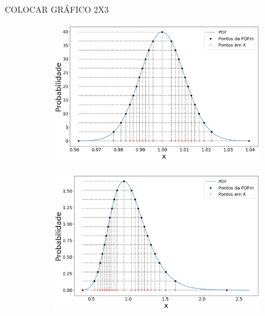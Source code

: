 {\color{red} COLOCAR GRÁFICO 2X3}

\begin{figure}[H]
	\centering
	\begin{subfigure}[b]{0.49\textwidth}
		\centering 
		\includegraphics[width=\textwidth]{./figuras/PDFm_lognormal_001.png}
		\caption{}
		\label{fig:pdflog001}
	\end{subfigure}
	\hfill
	\begin{subfigure}[b]{0.49\textwidth}
		\centering 
		\includegraphics[width=\textwidth]{./figuras/PDFm_lognormal_025}
		\caption{}
		\label{fig:pdflog025}
	\end{subfigure}
	

\end{figure}
